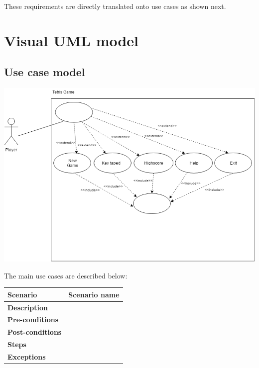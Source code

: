 \documentclass[a4paper]{article}
\begin{document}
These requirements are directly translated onto use cases as shown next.
\section{Visual UML model} 


\subsection{Use case model}

\begin{center}
	\includegraphics[scale=0.4]{resources/img/use_cases}
	\label{use-cases}
\end{center}

The main use cases are described below: 


\begin{table}[h]
	\centering
	\label{use-case1}
	\begin{tabular}{|l|l|}
		\hline
		\textbf{Scenario}        & \textbf{Scenario name} \\ \hline
		\textbf{Description}     &                        \\ \hline
		\textbf{Pre-conditions}  &                        \\ \hline
		\textbf{Post-conditions} &                        \\ \hline
		\textbf{Steps}           &                        \\ \hline
		\textbf{Exceptions}      &                        \\ \hline
	\end{tabular}
\end{table}
\end{document}
